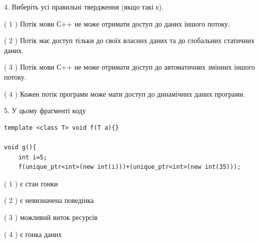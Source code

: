 \documentclass[12pt, ukrainian]{article}
\begin{document}
\begin {large}
{%
4. Виберіть усі правильні твердження (якщо такі є).\par
\vspace{2mm}

( 1 ) Потік мови С++ не може отримати доступ до даних іншого потоку.%

( 2 ) Потік має доступ тільки до своїх власних даних та до глобальних статичних даних.%

( 3 ) Потік мови С++ не може отримати доступ до автоматичних змінних іншого потоку.%

( 4 ) Кожен потік програми може мати доступ до динамічних даних програми.%


5. У цьому фрагменті коду
\begin{verbatim}
template <class T> void f(T a){}

void g(){
    int i=5;
    f(unique_ptr<int>(new int(i)))+(unique_ptr<int>(new int(35)));
\end{verbatim}
( 1 ) є стан гонки%

( 2 ) є невизначена поведінка%

( 3 ) можливий виток ресурсів%

( 4 ) є гонка даних%
}
\end {large}
\end{document}
